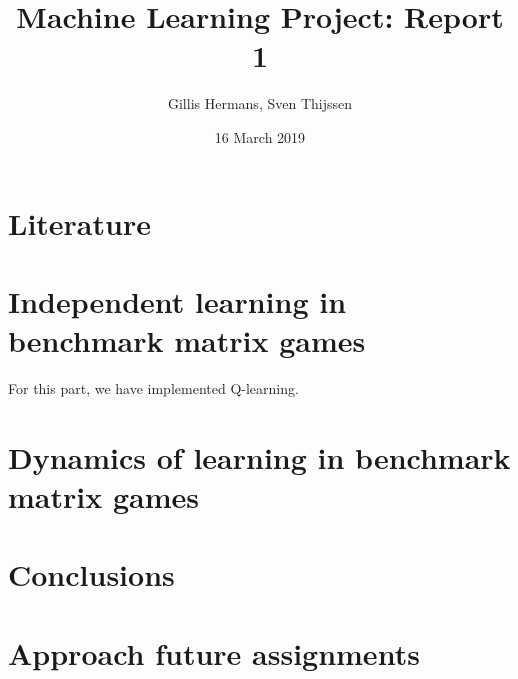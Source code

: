 \documentclass[10pt,a4paper]{article}
\author{Gillis Hermans, Sven Thijssen}
\title{Machine Learning Project: Report 1}
\date{16 March 2019}
\begin{document}
\maketitle
\section{Literature}
\section{Independent learning in benchmark matrix games}
For this part, we have implemented Q-learning.
\section{Dynamics of learning in benchmark matrix games}
\section{Conclusions}
\section{Approach future assignments}
\end{document}
